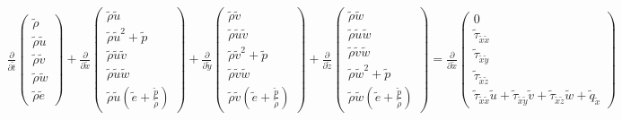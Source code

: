 \begin{align*}
\frac{\partial}{\partial \tilde{t}}
\begin{pmatrix}
\tilde{\rho}
\\
\tilde{\rho} \tilde{u}
\\
\tilde{\rho} \tilde{v}
\\
\tilde{\rho} \tilde{w}
\\
\tilde{\rho} \tilde{e}
\end{pmatrix}
+
\frac{\partial}{\partial \tilde{x}}
\begin{pmatrix}
\tilde{\rho} \tilde{u}
\\
\tilde{\rho} \tilde{u}^2 + \tilde{p}
\\
\tilde{\rho} \tilde{u}\tilde{v}
\\
\tilde{\rho} \tilde{u}\tilde{w}
\\
\tilde{\rho} \tilde{u}\left(\tilde{e}+\frac{\tilde{p}}{\tilde{\rho}}\right)
\end{pmatrix}
+
\frac{\partial}{\partial \tilde{y}}       
\begin{pmatrix}
\tilde{\rho} \tilde{v}
\\
\tilde{\rho} \tilde{u}\tilde{v}
\\
\tilde{\rho} \tilde{v}^2 + \tilde{p}
\\
\tilde{\rho} \tilde{v}\tilde{w}
\\
\tilde{\rho} \tilde{v}\left(\tilde{e}+\frac{\tilde{p}}{\tilde{\rho}}\right)
\end{pmatrix}
+
\frac{\partial}{\partial \tilde{z}}
\begin{pmatrix}
\tilde{\rho} \tilde{w}
\\
\tilde{\rho} \tilde{u}\tilde{w}
\\
\tilde{\rho} \tilde{v}\tilde{w}
\\
\tilde{\rho} \tilde{w}^2 + \tilde{p}
\\
\tilde{\rho} \tilde{w}\left(\tilde{e}+\frac{\tilde{p}}{\tilde{\rho}}\right)
\end{pmatrix}
=
\frac{\partial}{\partial \tilde{x}}
\begin{pmatrix}
0
\\
\tilde{\tau}_{\tilde{x}\tilde{x}}
\\
\tilde{\tau}_{\tilde{x}\tilde{y}}
\\
\tilde{\tau}_{\tilde{x}\tilde{z}}
\\
\tilde{\tau}_{\tilde{x}\tilde{x}}\tilde{u}+\tilde{\tau}_{\tilde{x}\tilde{y}}\tilde{v}+\tilde{\tau}_{\tilde{x}\tilde{z}}\tilde{w}+\tilde{q}_{\tilde{x}}
\end{pmatrix}

\end{align*}
